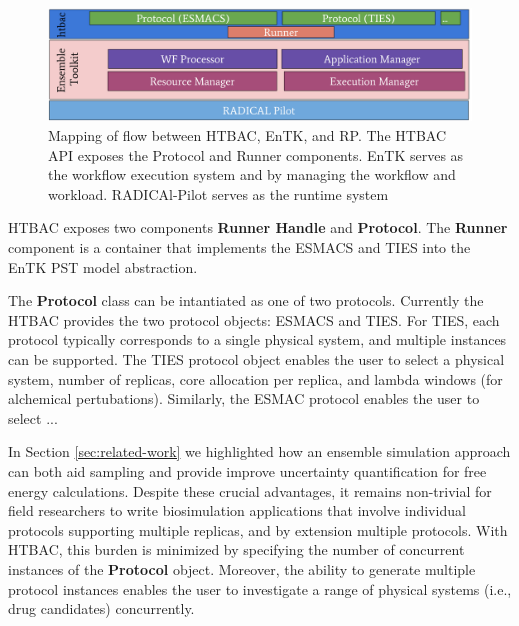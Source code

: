 \begin{figure}
  \centering
   \includegraphics[width=\columnwidth]{figures/isc_htbac_integration_with_entk_RP.pdf}
  \caption{Mapping of flow between HTBAC, EnTK, and RP. The HTBAC API exposes the Protocol
  and Runner components. EnTK serves as the workflow execution system and
  by managing the workflow and workload. RADICAl-Pilot serves as the runtime system}
\label{fig:integration}
\end{figure}


HTBAC exposes two components \textbf{Runner Handle} and \textbf{Protocol}.
The \textbf{Runner} component is a container  that implements the ESMACS and TIES into the
EnTK PST model abstraction. 

The \textbf{Protocol} class can be intantiated as one of two protocols.
Currently the HTBAC provides the two protocol objects: ESMACS and TIES. For
TIES, each protocol typically corresponds to a single physical system, and
multiple instances can be supported. The TIES protocol object enables the user
to select a physical system, number of replicas, core allocation per replica,
and lambda windows (for alchemical pertubations). Similarly, the ESMAC
protocol enables the user to select ...



	In Section \ref{sec:related-work} we highlighted how an ensemble
simulation approach can both aid sampling and provide improve uncertainty
quantification for free energy calculations. Despite these crucial advantages,
it remains non-trivial for field researchers to write biosimulation
applications that involve individual protocols supporting multiple replicas,
and by extension multiple protocols. With HTBAC, this burden is minimized by
specifying the number of concurrent instances of the \textbf{Protocol} object.
Moreover, the ability to generate multiple protocol instances enables the user
to investigate a range of physical systems (i.e., drug candidates)
concurrently.


